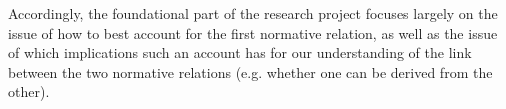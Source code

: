 Accordingly, the foundational part of the research project focuses largely on the issue of how to best account for the first normative relation, as well as the issue of which implications such an account has for our understanding of the link between the two normative relations (e.g. whether one can be derived from the other).


